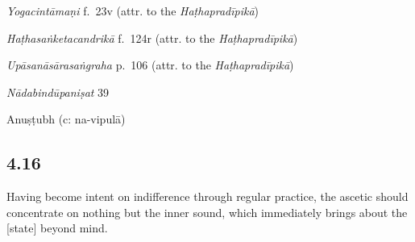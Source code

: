 \begin{ekdosis}

\begin{testimonia}[hp04_012]
\emph{Yogacintāmaṇi} f.~23v (attr. to the \emph{Haṭhapradīpikā})
\begin{versinnote}
\end{versinnote}

\emph{Haṭhasaṅketacandrikā} f.~124r (attr. to the \emph{Haṭhapradīpikā})
\begin{versinnote}
\end{versinnote}

\emph{Upāsanāsārasaṅgraha} p.~106 (attr. to the \emph{Haṭhapradīpikā})
\begin{versinnote}
\end{versinnote}

\emph{Nādabindūpaniṣat} 39
\begin{versinnote}
\end{versinnote}
\end{testimonia}


\begin{metre}[hp04_012]
Anuṣṭubh (c: na-vipulā)
\end{metre}

\subsection*{4.16}
\begin{translation}[hp04_016]
Having become intent on indifference through regular practice, the ascetic should concentrate on nothing but the inner sound, which immediately brings about the [state] beyond mind.%
\end{translation}


\end{ekdosis}
